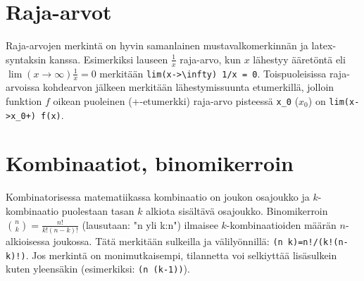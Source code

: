 \section{Raja-arvot}
Raja-arvojen merkintä on hyvin samanlainen mustavalkomerkinnän ja latex-syntaksin kanssa.
Esimerkiksi lauseen $\frac{1}{x}$ raja-arvo, kun $x$ lähestyy ääretöntä eli $\lim(x \rightarrow \infty) \frac{1}{x} = 0$
merkitään \verb$lim(x->\infty) 1/x = 0$.
Toispuoleisissa raja-arvoissa kohdearvon jälkeen merkitään lähestymissuunta etumerkillä,
jolloin funktion $f$ oikean puoleinen (+-etumerkki) raja-arvo pisteessä \verb$x_0$ ($x_0$) on \verb$lim(x->x_0+) f(x)$.

\section{Kombinaatiot, binomikerroin}
Kombinatorisessa matematiikassa kombinaatio on joukon osajoukko ja $k$-kombinaatio puolestaan tasan $k$ alkiota sisältävä osajoukko.
Binomikerroin ${n \choose k}=\frac{n!}{k!(n-k)!}$ (lausutaan: "n yli k:n") ilmaisee $k$-kombinaatioiden määrän $n$-alkioisessa joukossa.
Tätä merkitään sulkeilla ja välilyönnillä: \verb$(n k)=n!/(k!(n-k)!)$.
Jos merkintä on monimutkaisempi, tilannetta voi selkiyttää lisäsulkein kuten yleensäkin (esimerkiksi: \verb$(n (k-1))$).
